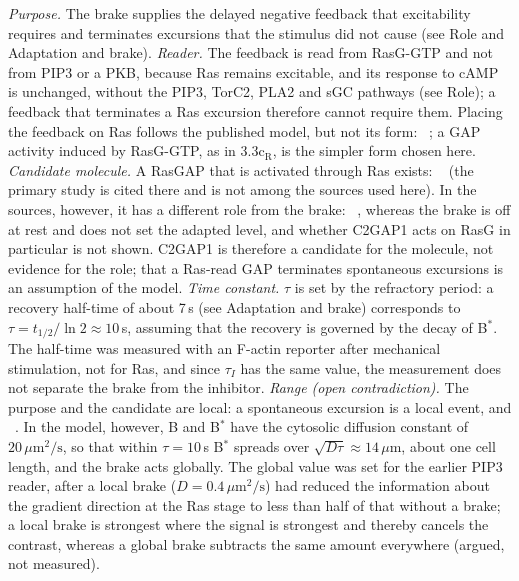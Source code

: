 \begin{description}
\emph{Purpose.} The brake supplies the delayed negative feedback that excitability requires and terminates excursions that the stimulus did not cause (see Role and Adaptation and brake).
\emph{Reader.} The feedback is read from RasG-GTP and not from PIP3 or a PKB, because Ras remains excitable, and its response to cAMP is unchanged, without the PIP3, TorC2, PLA2 and sGC pathways (see Role); a feedback that terminates a Ras excursion therefore cannot require them.
Placing the feedback on Ras follows the published model, but not its form: ~\cite{fukushima2019}; a GAP activity induced by RasG-GTP, as in 3.3c$_\mathrm{R}$, is the simpler form chosen here.
\emph{Candidate molecule.} A RasGAP that is activated through Ras exists: ~\cite{xu2022} (the primary study is cited there and is not among the sources used here).
In the sources, however, it has a different role from the brake: ~\cite{xu2021c2gap}, whereas the brake is off at rest and does not set the adapted level, and whether C2GAP1 acts on RasG in particular is not shown.
C2GAP1 is therefore a candidate for the molecule, not evidence for the role; that a Ras-read GAP terminates spontaneous excursions is an assumption of the model.
\emph{Time constant.} $\tau$ is set by the refractory period: a recovery half-time of about 7\,s (see Adaptation and brake) corresponds to $\tau=t_{1/2}/\ln 2\approx10$\,s, assuming that the recovery is governed by the decay of B$^*$.
The half-time was measured with an F-actin reporter after mechanical stimulation, not for Ras, and since $\tau_I$ has the same value, the measurement does not separate the brake from the inhibitor.
\emph{Range (open contradiction).} The purpose and the candidate are local: a spontaneous excursion is a local event, and ~\cite{xu2021c2gap}. In the model, however, B and B$^*$ have the cytosolic diffusion constant of $20\,\mu\mathrm{m^2/s}$, so that within $\tau=10$\,s B$^*$ spreads over $\sqrt{D\tau}\approx14\,\mu$m, about one cell length, and the brake acts globally.
The global value was set for the earlier PIP3 reader, after a local brake ($D=0.4\,\mu\mathrm{m^2/s}$) had reduced the information about the gradient direction at the Ras stage to less than half of that without a brake; a local brake is strongest where the signal is strongest and thereby cancels the contrast, whereas a global brake subtracts the same amount everywhere (argued, not measured).

\end{description}
